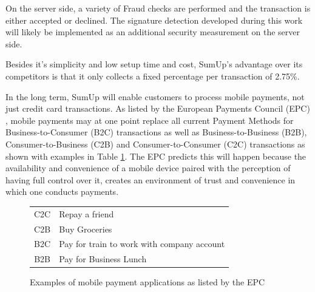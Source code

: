 \documentclass[a4paper, oneside]{csthesis}
\begin{document}
On the server side, a variety of Fraud checks are performed and the transaction is either accepted or declined. The signature detection developed during this work will likely be implemented as an additional security measurement on the server side.

Besides it's simplicity and low setup time and cost, SumUp's advantage over its competitors is that it only collects a fixed percentage per transaction of 2.75\%.

In the long term, SumUp will enable customers to process mobile payments, not just credit card transactions. As listed by the European Payments Council (EPC) \cite{mpwhitepaper}, mobile payments may at one point replace all current Payment Methods for Business-to-Consumer (B2C) transactions as well as Business-to-Business (B2B), Consumer-to-Business (C2B) and Consumer-to-Consumer (C2C) transactions as shown with examples in Table \ref{fig:mp-applications}. The EPC predicts this will happen because the availability and convenience of a mobile device paired with the perception of having full control over it, creates an environment of trust and convenience in which one conducts payments.


\begin{figure}
        \centering
        \begin{tabular}{c|l}
        \hline
C2C & Repay a friend \\ \hdashline[0.5pt/3pt]
C2B & Buy Groceries \\ \hdashline[0.5pt/3pt]
B2C & Pay for train to work with company account \\ \hdashline[0.5pt/3pt]
B2B & Pay for Business Lunch \\ \hline
        \end{tabular}
        \caption{Examples of mobile payment applications as listed by the EPC}\label{fig:mp-applications}
\end{figure}






\end{document}
